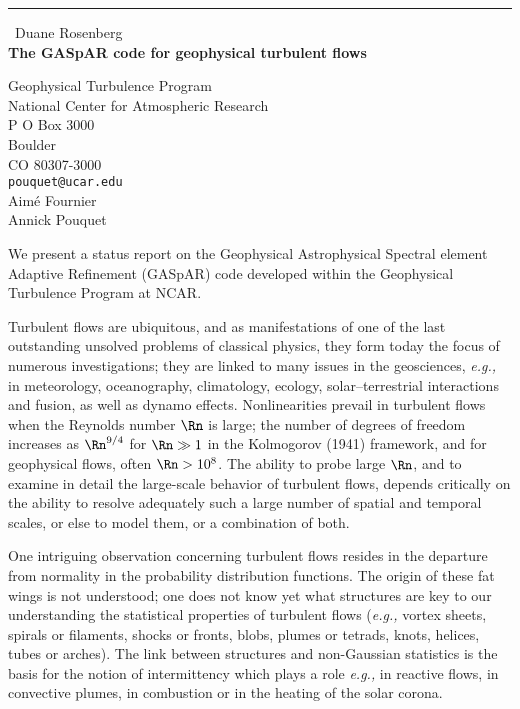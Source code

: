 \documentclass{report}
\begin{document}
\begin{center}
\rule{6in}{1pt} \
{\large Duane Rosenberg \\
{\bf The GASpAR code for geophysical turbulent flows}}

Geophysical Turbulence Program \\ National Center for Atmospheric Research \\ P O Box 3000 \\ Boulder \\ CO 80307-3000
\\
{\tt pouquet@ucar.edu}\\
Aim\'e Fournier\\
Annick Pouquet\end{center}

We present a status report on the Geophysical Astrophysical Spectral element
Adaptive Refinement (GASpAR) code developed within the Geophysical
Turbulence Program at NCAR.

Turbulent flows are ubiquitous, and as manifestations of one of the
last outstanding unsolved problems of classical physics, they form
today the focus of numerous investigations; they
are linked to many issues in the geosciences, {\it e.g.,} in meteorology,
oceanography, climatology, ecology, solar--terrestrial interactions
and fusion, as well as dynamo effects.
Nonlinearities prevail in turbulent flows when the
Reynolds number $\Rn$
is large; the number of degrees of freedom increases as
$\Rn^{9/4}$ for $\Rn\gg1$ in the Kolmogorov (1941) framework,
and for geophysical flows, often $\Rn> 10^8$.
The ability to probe large $\Rn$, and to examine in detail the
large-scale behavior of turbulent flows, depends
critically on the ability to resolve adequately such a large number of
spatial and temporal scales, or else to model them, or a combination of both.

One intriguing observation concerning turbulent flows
resides in the
departure from normality in the probability distribution
functions.
The origin of these fat wings is not understood;
one does not know yet what structures are key to our
understanding the statistical properties of turbulent flows ({\it e.g.,}
vortex sheets, spirals or filaments,
shocks or fronts, blobs, plumes or tetrads, knots, helices, tubes or
arches).
The link between structures and non-Gaussian statistics is the basis
for the notion of intermittency which plays a role {\it e.g.,} in
reactive flows, in convective plumes, in combustion or in the heating of
the solar corona.
\end{document}
